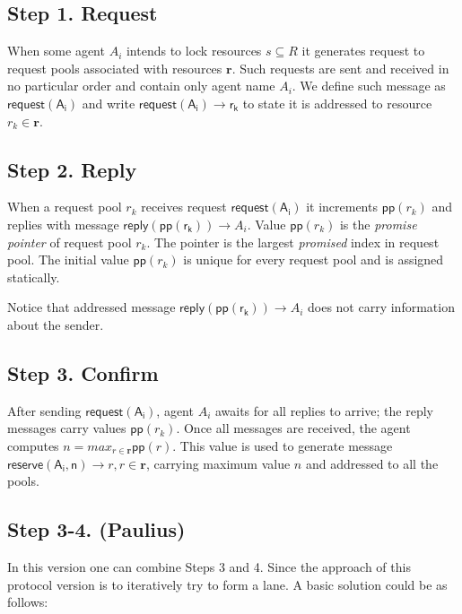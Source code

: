 \documentclass[11pt,parskip=half]{scrartcl} %
\begin{document}
	\subsection*{Step 1. Request}
	
	When some agent $A_i$ intends to lock resources $s \subseteq R$ it generates request to request pools associated with resources $\mathbf{r}$. Such requests are sent and received in no particular order and contain only agent name $A_i$. We define such message as $\mathsf{request(A_i)}$ and write $\mathsf{request(A_i) \rightarrow r_k}$ to state it is addressed to resource $r_k \in \mathbf{r}$.
	
	\subsection*{Step 2. Reply}
	
	When a request pool $r_k$ receives request $\mathsf{request(A_i)}$ it increments $\mathsf{pp}(r_k)$ and replies with message $\mathsf{reply(\mathsf{pp}(r_k))} \rightarrow A_i$. Value $\mathsf{pp}(r_k)$ is the \emph{promise pointer} of request pool $r_k$. The pointer is the largest \emph{promised} index in request pool. The initial value $\mathsf{pp}(r_k)$ is unique for every request pool and is assigned statically.
	
	Notice that addressed message $\mathsf{reply(\mathsf{pp}(r_k))} \rightarrow A_i$ does not carry information about the sender.
	
	\subsection*{Step 3. Confirm}
	
	After sending $\mathsf{request(A_i)}$, agent $A_i$ awaits for all replies to arrive; the reply messages carry values $\mathsf{pp}(r_k)$. Once all messages are received, the agent computes $n=max_{r \in \mathbf{r}} \mathsf{pp}(r)$. This value is used to generate message $\mathsf{reserve(A_i, n)} \rightarrow r, r \in \mathbf{r}$, carrying maximum value $n$ and addressed to all the pools.
	
	\subsection*{Step 3-4. (Paulius)}
	
	In this version one can combine Steps 3 and 4. Since the approach of this protocol version is to iteratively try to form a lane. A basic solution could be as follows:
	
\end{document}
